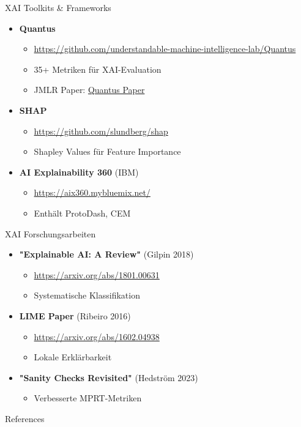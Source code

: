 \documentclass[aspectratio=1610, xcolor=dvipsnames, 9pt]{beamer}
\begin{document}
\begin{frame}{XAI Toolkits \& Frameworks}
  \begin{itemize}
    \item \textbf{Quantus}
    \begin{itemize}
      \item \url{https://github.com/understandable-machine-intelligence-lab/Quantus}
      \item 35+ Metriken für XAI-Evaluation
      \item JMLR Paper: \href{https://www.jmlr.org/papers/v24/22-0142.html}{Quantus Paper}
    \end{itemize}
    \item \textbf{SHAP}
    \begin{itemize}
      \item \url{https://github.com/slundberg/shap}
      \item Shapley Values für Feature Importance
    \end{itemize}
    \item \textbf{AI Explainability 360} (IBM)
    \begin{itemize}
      \item \url{https://aix360.mybluemix.net/}
      \item Enthält ProtoDash, CEM
    \end{itemize}
  \end{itemize}
\end{frame}

\begin{frame}{XAI Forschungsarbeiten}
  \begin{itemize}
    \item \textbf{"Explainable AI: A Review"} (Gilpin 2018)
    \begin{itemize}
      \item \url{https://arxiv.org/abs/1801.00631}
      \item Systematische Klassifikation
    \end{itemize}
    \item \textbf{LIME Paper} (Ribeiro 2016)
    \begin{itemize}
      \item \url{https://arxiv.org/abs/1602.04938}
      \item Lokale Erklärbarkeit
    \end{itemize}
    \item \textbf{"Sanity Checks Revisited"} (Hedström 2023)
    \begin{itemize}
      \item Verbesserte MPRT-Metriken
    \end{itemize}
  \end{itemize}
\end{frame}

\begin{frame}[allowframebreaks]{References}
  
  
\end{frame}
\end{document}
